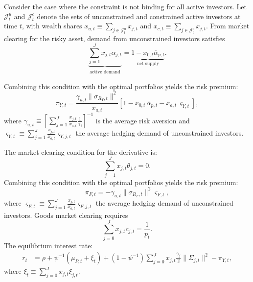 \documentclass[11pt,english]{article}
\begin{document}
Consider the case where the constraint is not binding for all active investors.
Let $\mathcal{J}_t^u$ and $\mathcal{J}_t^c$ denote the sets of unconstrained and constrained active investors at time $t$, with wealth shares $x_{u,t} \equiv \sum_{j\in \mathcal{J}_t^u} x_{j,t}$ and $x_{c,t} \equiv \sum_{j\in \mathcal{J}_t^c} x_{j,t}$. From market clearing for the risky asset, demand from unconstrained investors satisfies
\begin{equation}\label{eq:mkt-clearing}
    \underbrace{\sum_{j=1}^J x_{j,t} \alpha_{j,t} }_{\substack{\text{active demand}}} = \underbrace{1 - x_{0,t} \overline{\alpha}_{p,t} }_{\text{net supply}}.
\end{equation}

Combining this condition with the optimal portfolios yields the risk premium:
\begin{equation}\label{eq:sharpe_ratio}
    \pi_{Y,t} = \frac{\gamma_{u,t} \|\sigma_{R_Y,t}\|^2}{x_{a,t}}
    \left[ 1 - x_{0,t}\, \overline{\alpha}_{p,t}
    - x_{a,t}\, \varsigma_{Y,t} \right],
\end{equation}
where $\gamma_{u,t} \equiv [\sum_{j=1}^J \frac{x_{j,t}}{x_{a,t}} \frac{1}{\gamma_j}]^{-1}$ is the average risk aversion and $\varsigma_{Y,t} \equiv \sum_{j=1}^J \frac{x_{j,t}}{x_{a,t}} \varsigma_{Y,j,t}$ the average hedging demand of unconstrained investors.  

The market clearing condition for the derivative is:	
\begin{equation}
    \sum_{j=1}^J x_{j,t} \theta_{j,t} = 0.
\end{equation}
Combining this condition with the optimal portfolios yields the risk premium:
\begin{equation}
    \pi_{F,t} = -\gamma_{u,t} \|\sigma_{R_F,t}\|^2
     \varsigma_{F,t},
\end{equation}
where $\varsigma_{F,t} \equiv \sum_{j=1}^J \frac{x_{j,t}}{x_{a,t}} \varsigma_{F,j,t}$ the average hedging demand of unconstrained investors.  
Goods market clearing requires
\begin{equation}
    \sum_{j=0}^J x_{j,t} c_{j,t} = \frac{1}{p_t}.
\end{equation}
The equilibrium interest rate:
\begin{align}\label{eq:interest_rate}
    r_t &= \rho + \psi^{-1} (\mu_{P,t} + \xi_t )
    + (1-\psi^{-1}) \sum_{j=0}^J x_{j,t} 
        \frac{\gamma_j}{2} \|\Sigma_{j,t}\|^2
    - \pi_{Y,t},
\end{align}
where $\xi_t \equiv \sum_{j=0}^J x_{j,t} \xi_{j,t}$.  
\end{document}
